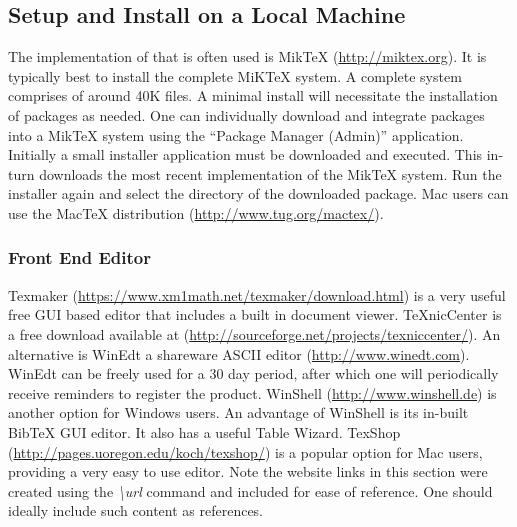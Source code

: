 \subsection{\latex Setup and Install on a Local Machine}
The implementation of \latex that is often used is MikTeX (\url{http://miktex.org}). It is typically best to install the complete MiKTeX  system. A complete system comprises of around 40K files. A minimal install will necessitate the installation of packages as needed. One can individually download and integrate packages into a MikTeX system using the ``Package Manager (Admin)'' application. Initially a small installer application must be downloaded and executed. This in-turn downloads the most recent implementation of the MikTeX system. Run the installer again and select the directory of the downloaded package. Mac users can use the MacTeX distribution (\url{http://www.tug.org/mactex/}).

\subsubsection{Front End Editor}
Texmaker (\url{https://www.xm1math.net/texmaker/download.html}) is a very useful free GUI based editor that includes a built in document viewer. TeXnicCenter is a free download available at (\url{http://sourceforge.net/projects/texniccenter/}). An alternative is WinEdt a shareware ASCII editor (\url{http://www.winedt.com}). WinEdt can be freely used for a 30 day period, after which one will periodically receive reminders to register the product. WinShell (\url{http://www.winshell.de}) is another option for Windows users. An advantage of WinShell is its in-built BibTeX GUI editor. It also has a useful Table Wizard. TexShop (\url{http://pages.uoregon.edu/koch/texshop/}) is a popular option for Mac users, providing a very easy to use editor. Note the website links in this section were created using the \emph{\textbackslash url} command and included for ease of reference. One should ideally include such content as references.  

\clearpage

